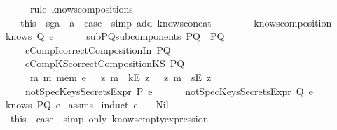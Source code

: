 \begin{isabellebody}
\ \ \ \ \ \ \isamarkupfalse \ {\isacharparenleft}rule\ knows{\isacharunderscore}composition{}{\isacharunderscore}s{\isacharparenright}\isanewline
\ \ \ \ \isamarkupfalse \ this\ \ sg{}a\ \ a{}\ \isamarkupfalse \ {\isacharquery}case\ \isamarkupfalse \ {\isacharparenleft}simp\ add{\isacharcolon}\ knows{\isacharunderscore}concat{\isacharunderscore}{}{\isacharparenright}\isanewline
\ \ \isamarkupfalse \ \isanewline
{}\isamarkupfalse \endisatagproof
{\isafoldproof}\isadelimproof
\ \isanewline
\endisadelimproof
\ \isanewline
{}\isamarkupfalse \ knows{\isacharunderscore}composition{}{\isacharcolon}\isanewline
\ \ {\isachardoublequoteopen}knows\ Q\ e{\isachardoublequoteclose}\isanewline
\ \ \ \ \ \ subPQ{\isacharcolon}{\isachardoublequoteopen}subcomponents\ PQ\ {\isacharequal}\ {\isacharbraceleft}P{\isacharcomma}Q{\isacharbraceright}{\isachardoublequoteclose}\ \isanewline
\ \ \ \ \ \ cCompI{\isacharcolon}{\isachardoublequoteopen}correctCompositionIn\ PQ{\isachardoublequoteclose}\isanewline
\ \ \ \ \ \ cCompKS{\isacharcolon}{\isachardoublequoteopen}correctCompositionKS\ PQ{\isachardoublequoteclose}\isanewline
\ \ \ \ \ \ {\isachardoublequoteopen}{\isasymforall}\ m{\isachardot}\ m\ mem\ e\ {\isasymlongrightarrow}\ {\isacharparenleft}{\isacharparenleft}{\isasymexists}\ z{\isachardot}\ m\ {\isacharequal}\ kE\ z{\isacharparenright}\ {\isasymor}\ {\isacharparenleft}{\isasymexists}\ z{\isachardot}\ m\ {\isacharequal}\ sE\ z{\isacharparenright}{\isacharparenright}{\isachardoublequoteclose}\isanewline
\ \ \ \ \ \ {\isachardoublequoteopen}notSpecKeysSecretsExpr\ P\ e{\isachardoublequoteclose}\isanewline
\ \ \ \ \ \ {\isachardoublequoteopen}notSpecKeysSecretsExpr\ Q\ e{\isachardoublequoteclose}\ \isanewline
\ \ {\isachardoublequoteopen}knows\ PQ\ e{\isachardoublequoteclose}\isanewline
\isadelimproof
\endisadelimproof
\isatagproof
{}\isamarkupfalse \ assms\isanewline
{}\isamarkupfalse \ {\isacharparenleft}induct\ e{\isacharparenright}\isanewline
\ \ \isamarkupfalse \ Nil\ \isanewline
\ \ \isamarkupfalse \ this\ \isamarkupfalse \ {\isacharquery}case\ \isamarkupfalse \ {\isacharparenleft}simp\ only{\isacharcolon}\ knows{\isacharunderscore}emptyexpression{\isacharparenright}\isanewline

\end{isabellebody}
